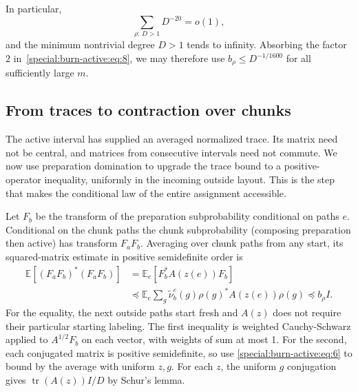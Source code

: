 In particular,
\begin{equation}
 \sum_{\rho:\,D>1}D^{-20}=o(1),\label{special:burn-active:eq:9}
\end{equation}
and the minimum nontrivial degree $D>1$ tends to infinity. Absorbing the factor $2$ in~\eqref{special:burn-active:eq:8}, we may therefore use $b_\rho\le D^{-1/1600}$ for all sufficiently large $m$.

\subsection{From traces to contraction over chunks}

The active interval has supplied an averaged normalized trace. Its matrix need not be central, and matrices from consecutive intervals need not commute. We now use preparation domination to upgrade the trace bound to a positive-operator inequality, uniformly in the incoming outside layout. This is the step that makes the conditional law of the entire assignment accessible.

Let \(F_b\) be the transform of the preparation subprobability conditional on paths \(e\). Conditional on the chunk paths the chunk subprobability (composing preparation then active) has transform \(F_a F_b\). Averaging over chunk paths from any start, its squared-matrix estimate in positive semidefinite order is
\begin{equation}
\begin{aligned}
 \mathbb E[(F_a F_b)^*(F_a F_b)]
 &=\mathbb E_e[F_b^* A(z(e)) F_b]\\
 &\preceq \mathbb E_e\sum_g\widetilde\nu_b^e(g)\rho(g)^* A(z(e))\rho(g)
 \preceq b_\rho I.
\end{aligned}\label{special:burn-active:eq:10}
\end{equation}
For the equality, the next outside paths start fresh and \(A(z)\) does not require their particular starting labeling. The first inequality is weighted Cauchy-Schwarz applied to \(A^{1/2}F_b\) on each vector, with weights of sum at most 1. For the second, each conjugated matrix is positive semidefinite, so use \eqref{special:burn-active:eq:6} to bound by the average with uniform \(z,g\). For each \(z\), the uniform \(g\) conjugation gives \(\operatorname{tr}(A(z))I/D\) by Schur's lemma.

